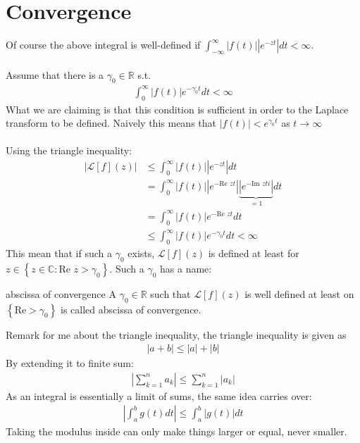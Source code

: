 \section{Convergence}
Of course the above integral is well-defined if $\int_{-\infty}^{\infty}\left|f\left(t\right)\right|\left|e^{-zt}\right|dt < \infty$.\\
$ $\\
Assume that there is a $\gamma_0 \in \mathbb{R}$ s.t. 
\begin{align*} 
	\int_{0}^{\infty}\left|f\left(t\right)\right|e^{-\gamma_0 t} dt < \infty
\end{align*}
What we are claiming is that this condition is sufficient in order to the Laplace transform to be defined. Naively this means that $\left|f\left(t\right)\right| < e^{\gamma_0 t}$ as $t \to \infty$\\
$ $\\
Using the triangle inequality:
\begin{align*} 
	\left|\mathcal{L}[f]\left(z\right)\right| &\leq \int_{0}^{\infty} \left|f\left(t\right)\right|\left|e^{-zt}\right|dt\\
	&= \int_{0}^{\infty}\left|f\left(t\right)\right|\left|e^{- \text{Re }z t}\right|\underbrace{\left|e^{- \text{Im }z t i}\right|}_{= 1}dt\\
	&= \int_{0}^{\infty}\left|f\left(t\right)\right|e^{-\text{Re }z t}dt\\
	&\leq \int_{0}^{\infty} \left|f\left(t\right)\right|e^{-\gamma_0 t}dt < \infty
\end{align*}
This mean that if such a $\gamma_0$ exists, $\mathcal{L}\left[f\right]\left(z\right)$ is defined at least for $z \in \left\{z \in \mathbb{C} : \text{Re }z > \gamma_0\right\}$. Such a $\gamma_0$ has a name:

\begin{definition}{abscissa of convergence}
	A $\gamma_0 \in \mathbb{R}$ such that $\mathcal{L}\left[f\right]\left(z\right)$ is well defined at least on $\left\{\text{Re} > \gamma_0\right\}$ is called abscissa of convergence.
\end{definition}


\begin{framedremark}
Remark for me about the triangle inequality, the triangle inequality is given as 
\begin{align*} 
	\left|a + b\right| \leq \left|a\right| + \left|b\right|
\end{align*}
By extending it to finite sum:
\begin{align*} 
	\left|\sum_{k= 1}^{n}a_k\right| \leq \sum_{k= 1}^{n}\left|a_k\right|
\end{align*}
As an integral is essentially a limit of sums, the same idea carries over:
\begin{align*} 
	\left|\int_{a}^{b}g\left(t\right)dt\right| \leq \int_{a}^{b}\left|g\left(t\right)\right|dt
\end{align*}
Taking the modulus inside can only make things larger or equal, never smaller.
\end{framedremark}






